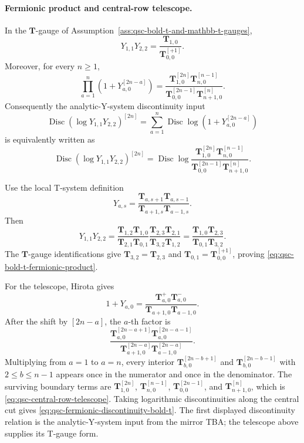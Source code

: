\paragraph{Fermionic product and central-row telescope.}
In the \(\mathbf T\)-gauge of
Assumption~\ref{ass:qsc-bold-t-and-mathbb-t-gauges},
\begin{equation}
  Y_{1,1}Y_{2,2}
  =
  \frac{\mathbf T_{1,0}}{\mathbf T_{0,0}^{[+1]}}.
  \label{eq:qsc-bold-t-fermionic-product}
\end{equation}
Moreover, for every \(n\geq1\),
\begin{equation}
  \prod_{a=1}^n
  \left(1+Y_{a,0}^{[2n-a]}\right)
  =
  \frac{
    \mathbf T_{1,0}^{[2n]}\mathbf T_{n,0}^{[n-1]}
  }{
    \mathbf T_{0,0}^{[2n-1]}\mathbf T_{n+1,0}^{[n]}
  } .
  \label{eq:qsc-central-row-telescope}
\end{equation}
Consequently the analytic-Y-system discontinuity input
\[
  \operatorname{Disc}
  \left(\log Y_{1,1}Y_{2,2}\right)^{[2n]}
  =
  \sum_{a=1}^n
  \operatorname{Disc}\log
  \left(1+Y_{a,0}^{[2n-a]}\right)
\]
is equivalently written as
\begin{equation}
  \operatorname{Disc}
  \left(\log Y_{1,1}Y_{2,2}\right)^{[2n]}
  =
  \operatorname{Disc}\log
  \frac{
    \mathbf T_{1,0}^{[2n]}\mathbf T_{n,0}^{[n-1]}
  }{
    \mathbf T_{0,0}^{[2n-1]}\mathbf T_{n+1,0}^{[n]}
  } .
  \label{eq:qsc-fermionic-discontinuity-bold-t}
\end{equation}

Use the local T-system definition
\[
  Y_{a,s}
  =
  \frac{\mathbf T_{a,s+1}\mathbf T_{a,s-1}}
       {\mathbf T_{a+1,s}\mathbf T_{a-1,s}} .
\]
Then
\[
  Y_{1,1}Y_{2,2}
  =
  \frac{\mathbf T_{1,2}\mathbf T_{1,0}}
       {\mathbf T_{2,1}\mathbf T_{0,1}}
  \frac{\mathbf T_{2,3}\mathbf T_{2,1}}
       {\mathbf T_{3,2}\mathbf T_{1,2}}
  =
  \frac{\mathbf T_{1,0}\mathbf T_{2,3}}
       {\mathbf T_{0,1}\mathbf T_{3,2}}.
\]
The \(\mathbf T\)-gauge identifications give
\(\mathbf T_{3,2}=\mathbf T_{2,3}\) and
\(\mathbf T_{0,1}=\mathbf T_{0,0}^{[+1]}\), proving
\eqref{eq:qsc-bold-t-fermionic-product}.

For the telescope, Hirota gives
\[
  1+Y_{a,0}
  =
  \frac{\mathbf T_{a,0}^+\mathbf T_{a,0}^-}
       {\mathbf T_{a+1,0}\mathbf T_{a-1,0}} .
\]
After the shift by \([2n-a]\), the \(a\)-th factor is
\[
  \frac{
    \mathbf T_{a,0}^{[2n-a+1]}
    \mathbf T_{a,0}^{[2n-a-1]}
  }{
    \mathbf T_{a+1,0}^{[2n-a]}
    \mathbf T_{a-1,0}^{[2n-a]}
  } .
\]
Multiplying from \(a=1\) to \(a=n\), every interior
\(\mathbf T_{b,0}^{[2n-b+1]}\) and
\(\mathbf T_{b,0}^{[2n-b-1]}\) with \(2\leq b\leq n-1\) appears once in the
numerator and once in the denominator.  The surviving boundary terms are
\(\mathbf T_{1,0}^{[2n]}\), \(\mathbf T_{n,0}^{[n-1]}\),
\(\mathbf T_{0,0}^{[2n-1]}\), and \(\mathbf T_{n+1,0}^{[n]}\), which is
\eqref{eq:qsc-central-row-telescope}.  Taking logarithmic discontinuities
along the central cut gives \eqref{eq:qsc-fermionic-discontinuity-bold-t}.
The first displayed discontinuity relation is the analytic-Y-system input
from the mirror TBA; the telescope above supplies its T-gauge form.

